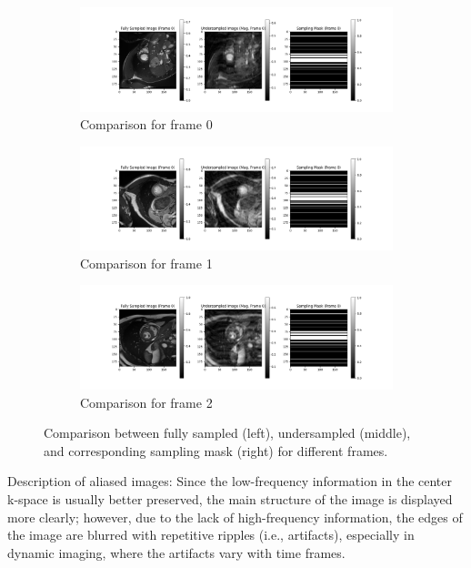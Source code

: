 \documentclass{article}
\begin{document}
\begin{figure}[H]
  \centering
  \begin{subfigure}[b]{\linewidth}
    \includegraphics[width=\linewidth]{../assets/comparison_image_0.png}
    \caption{Comparison for frame 0}
    \label{fig:comparison_image_0}
  \end{subfigure}
  \quad
  \begin{subfigure}[b]{\linewidth}
    \includegraphics[width=\linewidth]{../assets/comparison_image_1.png}
    \caption{Comparison for frame 1}
    \label{fig:comparison_image_1}
  \end{subfigure}
  \quad
  \begin{subfigure}[b]{\linewidth}
    \includegraphics[width=\linewidth]{../assets/comparison_image_2.png}
    \caption{Comparison for frame 2}
    \label{fig:comparison_image_2}
  \end{subfigure}
  \caption{Comparison between fully sampled (left), undersampled (middle), and corresponding sampling mask (right) for different frames.}
  \label{fig:comparison_images}
\end{figure}

Description of aliased images: Since the low-frequency information in the center k-space
is usually better preserved, the main structure of the image is displayed more clearly;
however, due to the lack of high-frequency information, the edges of the image are
blurred with repetitive ripples (i.e., artifacts), especially in dynamic imaging,
where the artifacts vary with time frames.
\end{document}
